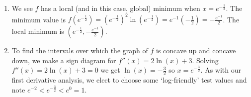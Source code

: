 \documentclass{ximera}
\begin{document}
\begin{example}
\begin{explanation}
\begin{enumerate}
\begin{image}
\begin{tikzpicture}[>=Latex, every node/.style={font=\normalsize}]
\end{tikzpicture}

\end{image}

We interpret the sign diagram using Theorem \ref{firstderivatveandgraphs} as follows:

\begin{image}

\end{image}


We find $f$ is decreasing on $\left(0, e^{-\frac{1}{2}} \right)$ and increasing on $\left( e^{-\frac{1}{2}}, \infty\right)$.

\item  We see $f$ has a local (and in this case, global) minimum when $x = e^{-\frac{1}{2}}$.  The minimum value is $f\left(e^{-\frac{1}{2}}\right) = \left(e^{-\frac{1}{2}}\right)^2 \ln\left(e^{-\frac{1}{2}}\right) = e^{-1} \left(-\frac{1}{2}\right) = -\frac{e^{-1}}{2}$. The local minimum is $\left( e^{-\frac{1}{2}}, -\frac{e^{-1}}{2} \right)$.



\item  To find the intervals over which the graph of $f$ is concave up and concave down, we make a sign diagram for $f''(x) = 2\ln(x) + 3$.  Solving $f''(x) = 2 \ln(x) + 3 = 0$ we get $\ln(x) = -\frac{3}{2}$ so $x = e^{-\frac{3}{2}}$.  As with our first derivative analysis, we elect to choose some `log-friendly' test values and note $e^{-2} < e^{-\frac{3}{2}} < e^{0} = 1$.  


\end{enumerate}
\end{explanation}
\end{example}
\end{document}
